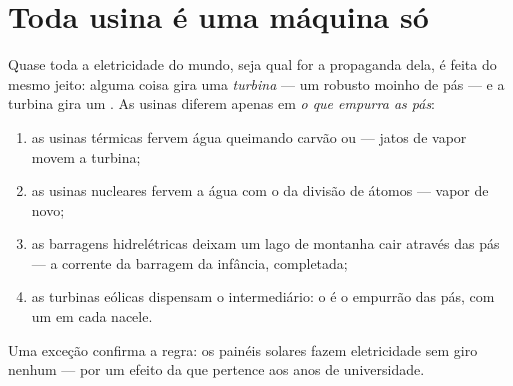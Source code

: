 \section{Toda usina é uma máquina só}

\begin{proposition}\label{prop:g9:alternator:core}
Quase toda a eletricidade do mundo, seja qual for a propaganda dela,
é feita do mesmo jeito: alguma coisa gira uma \emph{turbina} --- um
robusto moinho de pás --- e a turbina gira um . As usinas
diferem apenas em \emph{o que empurra as pás}:
\begin{enumerate}
  \item as usinas térmicas fervem água queimando carvão ou  ---
        jatos de vapor movem a turbina;
  \item as usinas nucleares fervem a água com o  da divisão de
        átomos --- vapor de novo;
  \item as barragens hidrelétricas deixam um lago de montanha cair
        através das pás --- a corrente da barragem da infância,
        completada;
  \item as turbinas eólicas dispensam o intermediário: o  é o
        empurrão das pás, com um  em cada nacele.
\end{enumerate}
Uma exceção confirma a regra: os painéis solares fazem eletricidade
sem giro nenhum --- por um efeito da  que pertence aos anos de
universidade.
\end{proposition}

